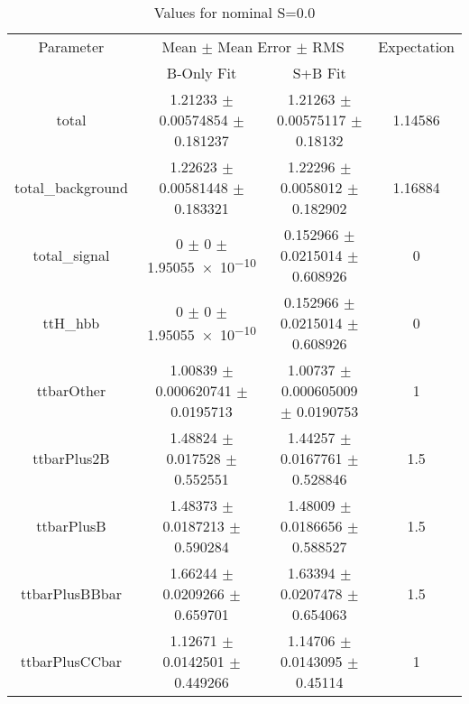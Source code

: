 \begin{table}
\centering
\caption{Values for nominal S=0.0}
\begin{tabular}{cccc}
\toprule
Parameter & \multicolumn{2}{c}{Mean $\pm$ Mean Error $\pm$ RMS} & Expectation\\
 & B-Only Fit & S+B Fit & \\
\midrule
total & \num{1.21233} $\pm$ \num{0.00574854} $\pm$ \num{0.181237} & \num{1.21263} $\pm$ \num{0.00575117} $\pm$ \num{0.18132} & \num{1.14586}\\
total\_background & \num{1.22623} $\pm$ \num{0.00581448} $\pm$ \num{0.183321} & \num{1.22296} $\pm$ \num{0.0058012} $\pm$ \num{0.182902} & \num{1.16884}\\
total\_signal & \num{0} $\pm$ \num{0} $\pm$ \num{1.95055e-10} & \num{0.152966} $\pm$ \num{0.0215014} $\pm$ \num{0.608926} & \num{0}\\
ttH\_hbb & \num{0} $\pm$ \num{0} $\pm$ \num{1.95055e-10} & \num{0.152966} $\pm$ \num{0.0215014} $\pm$ \num{0.608926} & \num{0}\\
ttbarOther & \num{1.00839} $\pm$ \num{0.000620741} $\pm$ \num{0.0195713} & \num{1.00737} $\pm$ \num{0.000605009} $\pm$ \num{0.0190753} & \num{1}\\
ttbarPlus2B & \num{1.48824} $\pm$ \num{0.017528} $\pm$ \num{0.552551} & \num{1.44257} $\pm$ \num{0.0167761} $\pm$ \num{0.528846} & \num{1.5}\\
ttbarPlusB & \num{1.48373} $\pm$ \num{0.0187213} $\pm$ \num{0.590284} & \num{1.48009} $\pm$ \num{0.0186656} $\pm$ \num{0.588527} & \num{1.5}\\
ttbarPlusBBbar & \num{1.66244} $\pm$ \num{0.0209266} $\pm$ \num{0.659701} & \num{1.63394} $\pm$ \num{0.0207478} $\pm$ \num{0.654063} & \num{1.5}\\
ttbarPlusCCbar & \num{1.12671} $\pm$ \num{0.0142501} $\pm$ \num{0.449266} & \num{1.14706} $\pm$ \num{0.0143095} $\pm$ \num{0.45114} & \num{1}\\
\bottomrule
\end{tabular}
\end{table}